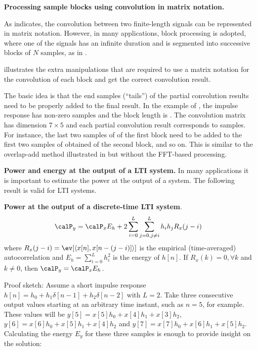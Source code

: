 \bApplication \textbf{Processing sample blocks using convolution in matrix notation.}
\label{app:blocksMatrixConvolution}

As  indicates, the convolution between two finite-length signals can be represented in matrix notation. However, in many applications, block processing is adopted, where one of the signals has an infinite duration and is segmented into successive blocks of $N$ samples, as in .

 illustrates the extra manipulations that are required to use a matrix notation for the convolution of each block and get the correct convolution result.


The basic idea is that the end samples (``tails'') of the partial convolution results need to be properly added to the final result. In the example of , the impulse response has  non-zero samples and the block length is . The convolution matrix  has dimension $7 \times 5$ and each partial convolution result corresponds to  samples. For instance, the last two samples of  of the first block need to be added to the first two samples of  obtained of the second block, and so on. This is similar to the overlap-add method illustrated in  but without the FFT-based processing.
\eApplication

\bApplication
\textbf{Power and energy at the output of a LTI system.}
In many applications it is important to estimate the power at the output of a system. The following result is valid for LTI systems.

\bTheorem \textbf{Power at the output of a discrete-time LTI system}.
\label{th:output-power-of-lti}
\begin{equation}
\calP_y = \calP_x E_h + 2 \sum_{i=0}^L \sum_{j=0, j \ne i}^L h_i h_j R_x(j-i)
\label{eq:power_lti}
\end{equation}
where $R_x(j-i) = \ev[\langle x[n],x[n-(j-i)]\rangle]$ is the empirical (time-averaged) autocorrelation and $E_h = \sum_{i=0}^L h_i^2$ is the energy of $h[n]$. If $R_x(k)=0, \forall k$ and $k \ne 0$, then $\calP_y = \calP_x E_h$.

Proof sketch:
Assume a short impulse response $h[n]=h_0 + h_1 \delta[n-1] + h_2 \delta[n-2]$ with $L=2$. Take three consecutive output values starting at an arbitrary time instant, such as $n=5$, for example. These values will be
$y[5]=x[5]h_0 + x[4]h_1 + x[3]h_2$, $y[6]=x[6]h_0 + x[5]h_1 + x[4]h_2$ and $y[7]=x[7]h_0 + x[6]h_1 + x[5]h_2$. Calculating the energy $E_y$ for these three samples is enough to provide insight on the solution:

